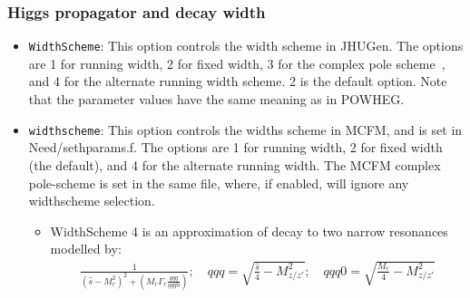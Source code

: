 \documentclass[aps,superscriptaddress,nofootinbib]{revtex4}
\begin{document}
\subsubsection{Higgs propagator and decay width}
\begin{itemize}
\item \verb|WidthScheme|: This option controls the width scheme in JHUGen. The options are 1 for running width, 2 for fixed width, 3 for the complex pole scheme~\cite{Passarino:2010qk,Goria:2011wa}, and 4 for the alternate running width scheme. 2 is the default option.  Note that the parameter values have the same meaning as in POWHEG.
\item \verb|widthscheme|: This option controls the widths scheme in MCFM, and is set in Need/sethparams.f. The options are 1 for running width, 2 for fixed width (the default), and 4 for the alternate running width. The MCFM complex pole-scheme is set in the same file, where, if enabled, will ignore any widthscheme selection.
\begin{itemize}
  \item WidthScheme 4 is an approximation of decay to two narrow resonances modelled by:
  \begin{align*}
    \frac{1}{(\hat{s} - M_{r}^2)^2 + (M_{r}\Gamma_{r}\frac{qqq}{qqq0})}; \quad qqq=\sqrt{\frac{\hat{s}}{4} - M_{z/z'}^2}; \quad qqq0=\sqrt{\frac{M_{r}}{4} - M_{z/z'}^2}
  \end{align*}
  

\end{itemize}
\end{itemize}
\end{document}
